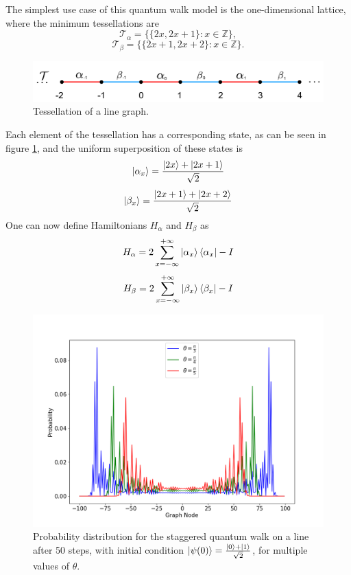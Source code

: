 \documentclass[../../dissertation.tex]{subfiles}
\begin{document}
The simplest use case of this quantum walk model is the one-dimensional
lattice, where the minimum tessellations are
\begin{equation}
	\mathscr{T}_{\alpha}= \{\{2x,2x+1\}\colon x \in \mathbb{Z}\},
\end{equation}
\begin{equation}
	\mathscr{T}_{\beta}= \{\{2x+1,2x+2\}\colon x \in \mathbb{Z}\}.
\end{equation}
\begin{figure}[!h]
	\centering
	\includegraphics[scale=0.40]{img/StagQuantumWalk/tesselation.png}
	\caption{Tessellation of a line graph.} 
	\label{fig:stagQWTesselation}
\end{figure}
Each element of the tessellation has a corresponding state, as can be seen in
figure \ref{fig:stagQWTesselation}, and the uniform superposition of these
states is
\begin{equation}
	\ket{\alpha_x} = \frac{\ket{2x} + \ket{2x+1}}{\sqrt{2}}
\end{equation}
\begin{equation}
	\ket{\beta_x} = \frac{\ket{2x+1}+\ket{2x+2}}{\sqrt{2}}
\end{equation}
One can now define Hamiltonians $H_\alpha$ and $H_\beta$ as 
\begin{equation}
	H_\alpha = 2\sum_{x=-\infty}^{+\infty}\ket{\alpha_{x}}\bra{\alpha_x} - I
	\label{eq:stagSimulHalpha}
\end{equation}
\begin{equation}
	H_\beta = 2\sum_{x=-\infty}^{+\infty}\ket{\beta_{x}}\bra{\beta_x} - I
	\label{eq:stagSimulHbeta}
\end{equation}
\begin{figure}[!h]
	\centering
	\includegraphics[scale=0.40]{img/StagQuantumWalk/stagqwMultiple.png}
	\caption{Probability distribution for the staggered quantum walk on a line after 50 steps, with initial condition $\ket{\psi(0)}=\frac{\ket{0}+\ket{1}}{\sqrt{2}}$, for multiple values of $\theta$.} 
	\label{fig:stagQWSimulMultTheta}
\end{figure}\par
\end{document}
